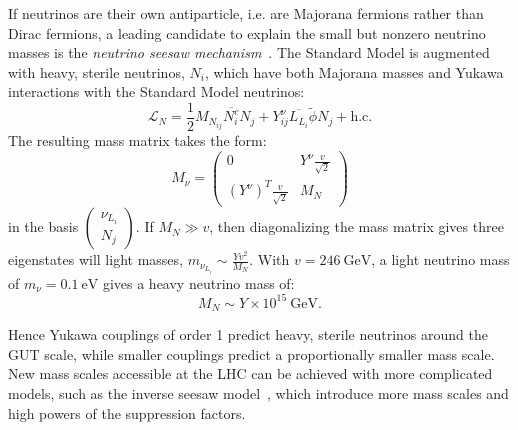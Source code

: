 If neutrinos are their own antiparticle, i.e. are Majorana fermions rather than Dirac fermions, a leading candidate to explain the small but nonzero neutrino masses is the \emph{neutrino seesaw mechanism}~\cite{gellmann, ramond, yanagida, RevModPhys.75.345}. The Standard Model is augmented with heavy, sterile neutrinos, $N_i$, which have both Majorana masses and Yukawa interactions with the Standard Model neutrinos:
\begin{equation}
	\mathcal{L}_N = \frac12 M_{N_{ij}} \overline{N^c_i} N_j + Y_{ij}^{\nu} \overline{L_{L_i}} \tilde{\phi} N_{j} + \mathrm{h.c.}
\end{equation}
The resulting mass matrix takes the form:
\begin{equation}
	M_{\nu} = \left(\begin{array}{cc} 0 & Y^{\nu} \frac{v}{\sqrt{2}} \\ (Y^{\nu})^T \frac{v}{\sqrt{2}} & M_N \end{array}\right)
\end{equation}
in the basis $\left(\begin{array}{c} \nu_{L_i} \\ N_j \end{array} \right)$. If $M_N \gg v$, then diagonalizing the mass matrix gives three eigenstates will light masses, $m_{\nu_{L_i}} \sim  \frac{Yv^2}{M_N}$. With $v=246~\mbox{GeV}$, a light neutrino mass of $m_{\nu}=0.1~\mbox{eV}$ gives a heavy neutrino mass of:
\begin{equation}
	M_N \sim Y \times 10^{15}~\mbox{GeV}.
\end{equation}

Hence Yukawa couplings of order 1 predict heavy, sterile neutrinos around the GUT scale, while smaller couplings predict a proportionally smaller mass scale. New mass scales accessible at the LHC can be achieved with more complicated models, such as the inverse seesaw model~\cite{inverse seesaw}, which introduce more mass scales and high powers of the suppression factors.

